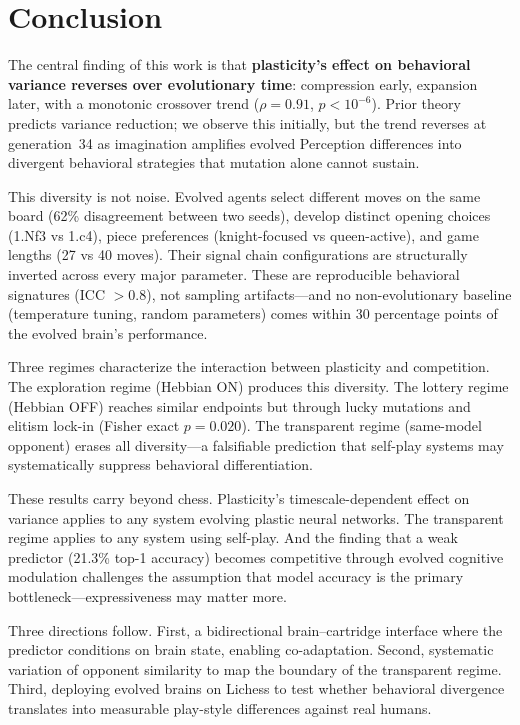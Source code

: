 \documentclass[11pt,a4paper]{article}
\begin{document}
\section{Conclusion}

The central finding of this work is that \textbf{plasticity's effect on behavioral variance reverses over evolutionary time}: compression early, expansion later, with a monotonic crossover trend ($\rho = 0.91$, $p < 10^{-6}$).
Prior theory~\citep{paenke2009baldwin} predicts variance reduction; we observe this initially, but the trend reverses at generation~34 as imagination amplifies evolved Perception differences into divergent behavioral strategies that mutation alone cannot sustain.

This diversity is not noise.
Evolved agents select different moves on the same board (62\% disagreement between two seeds), develop distinct opening choices (1.Nf3 vs 1.c4), piece preferences (knight-focused vs queen-active), and game lengths (27 vs 40 moves).
Their signal chain configurations are structurally inverted across every major parameter.
These are reproducible behavioral signatures (ICC $> 0.8$), not sampling artifacts---and no non-evolutionary baseline (temperature tuning, random parameters) comes within 30 percentage points of the evolved brain's performance.

Three regimes characterize the interaction between plasticity and competition.
The exploration regime (Hebbian ON) produces this diversity.
The lottery regime (Hebbian OFF) reaches similar endpoints but through lucky mutations and elitism lock-in (Fisher exact $p = 0.020$).
The transparent regime (same-model opponent) erases all diversity---a falsifiable prediction that self-play systems may systematically suppress behavioral differentiation.

These results carry beyond chess.
Plasticity's timescale-dependent effect on variance applies to any system evolving plastic neural networks.
The transparent regime applies to any system using self-play.
And the finding that a weak predictor (21.3\% top-1 accuracy) becomes competitive through evolved cognitive modulation challenges the assumption that model accuracy is the primary bottleneck---expressiveness may matter more.

Three directions follow.
First, a bidirectional brain--cartridge interface where the predictor conditions on brain state, enabling co-adaptation.
Second, systematic variation of opponent similarity to map the boundary of the transparent regime.
Third, deploying evolved brains on Lichess to test whether behavioral divergence translates into measurable play-style differences against real humans.
\end{document}
